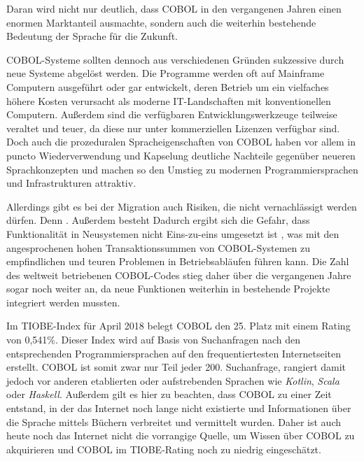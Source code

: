 Daran wird nicht nur deutlich, dass COBOL in den vergangenen Jahren einen enormen Marktanteil ausmachte, sondern auch die weiterhin bestehende Bedeutung der Sprache für die Zukunft.

COBOL-Systeme sollten dennoch aus verschiedenen Gründen sukzessive durch neue Systeme abgelöst werden. Die Programme werden oft auf Mainframe Computern ausgeführt oder gar entwickelt, deren Betrieb um ein vielfaches höhere Kosten verursacht als moderne IT-Landschaften mit konventionellen Computern. Außerdem sind die verfügbaren Entwicklungswerkzeuge teilweise veraltet und teuer, da diese nur unter kommerziellen Lizenzen verfügbar sind. Doch auch die prozeduralen Spracheigenschaften von COBOL haben vor allem in puncto Wiederverwendung und Kapselung deutliche Nachteile gegenüber neueren Sprachkonzepten und machen so den Umstieg zu modernen Programmiersprachen und Infrastrukturen attraktiv.

Allerdings gibt es bei der Migration auch Risiken, die nicht vernachlässigt werden dürfen. Denn  \cite{beat_balzli_cobol-programmierer_2017}. 
Außerdem besteht  \cite{sneed_softwaremigration_2010}
Dadurch ergibt sich die Gefahr, dass Funktionalität in Neusystemen nicht Eins-zu-eins umgesetzt ist \cite{sneed_softwaremigration_2010}, was mit den angesprochenen hohen Transaktionssummen von COBOL-Systemen zu empfindlichen und teuren Problemen in Betriebsabläufen führen kann. Die Zahl des weltweit betriebenen COBOL-Codes stieg daher über die vergangenen Jahre sogar noch weiter an, da neue Funktionen weiterhin in bestehende Projekte integriert werden mussten.

Im TIOBE-Index \cite{_tiobe_} für April 2018 belegt COBOL den 25. Platz mit einem Rating von 0,541\%. Dieser Index wird auf Basis von Suchanfragen nach den entsprechenden Programmiersprachen auf den frequentiertesten Internetseiten erstellt. COBOL ist somit zwar nur Teil jeder 200. Suchanfrage, rangiert damit jedoch vor anderen etablierten oder aufstrebenden Sprachen wie \textit{Kotlin}, \textit{Scala} oder \textit{Haskell}. Außerdem gilt es hier zu beachten, dass COBOL zu einer Zeit entstand, in der das Internet noch lange nicht existierte und Informationen über die Sprache mittels Büchern verbreitet und vermittelt wurden. Daher ist auch heute noch das Internet nicht die vorrangige Quelle, um Wissen über COBOL zu akquirieren und COBOL im TIOBE-Rating noch zu niedrig eingeschätzt.



